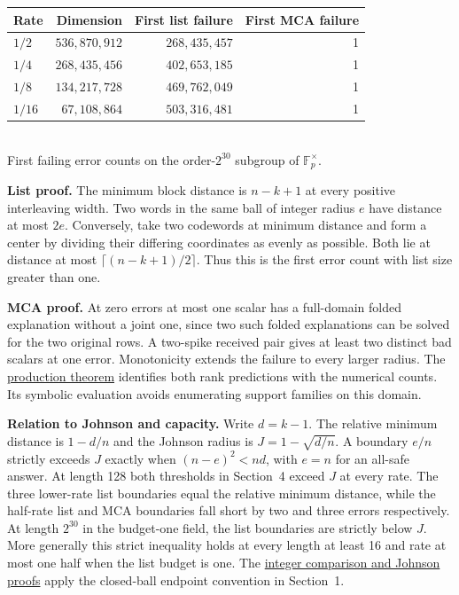 \documentclass[11pt,letterpaper]{article}
\begin{document}
\begin{center}
\begin{tabular}{@{}lrrr@{}}\toprule
Rate & Dimension & First list failure & First MCA failure\\\midrule
$1/2$  & $536{,}870{,}912$ & $268{,}435{,}457$ & 1\\
$1/4$  & $268{,}435{,}456$ & $402{,}653{,}185$ & 1\\
$1/8$  & $134{,}217{,}728$ & $469{,}762{,}049$ & 1\\
$1/16$ & $67{,}108{,}864$  & $503{,}316{,}481$ & 1\\\bottomrule
\end{tabular}\\[4pt]
{\small First failing error counts on the order-$2^{30}$ subgroup of $\mathbb F_p^\times$.}
\end{center}

\textbf{List proof.} The minimum block distance is $n-k+1$ at every positive interleaving width.
Two words in the same ball of integer radius $e$ have distance at most $2e$.
Conversely, take two codewords at minimum distance and form a center by dividing their differing coordinates as evenly as possible. Both lie at distance at most $\lceil(n-k+1)/2\rceil$. Thus this is the first error count with list size greater than one.

\textbf{MCA proof.} At zero errors at most one scalar has a full-domain folded explanation without a joint one, since two such folded explanations can be solved for the two original rows. A two-spike received pair gives at least two distinct bad scalars at one error. Monotonicity extends the failure to every larger radius. The
\href{https://github.com/SlopDotCash/proximityprize/blob/d7087b90e15b9ccb4232d248c47061e49a06c074/ArkLib/Research/ProximityGap/RankProductionDomain.lean}{production theorem}
identifies both rank predictions with the numerical counts. Its symbolic evaluation avoids enumerating support families on this domain.

\textbf{Relation to Johnson and capacity.} Write $d=k-1$. The relative minimum distance is $1-d/n$ and the Johnson radius is $J=1-\sqrt{d/n}$. A boundary $e/n$ strictly exceeds $J$ exactly when $(n-e)^2<nd$, with $e=n$ for an all-safe answer. At length 128 both thresholds in Section~4 exceed $J$ at every rate. The three lower-rate list boundaries equal the relative minimum distance, while the half-rate list and MCA boundaries fall short by two and three errors respectively. At length $2^{30}$ in the budget-one field, the list boundaries are strictly below $J$. More generally this strict inequality holds at every length at least 16 and rate at most one half when the list budget is one.
The \href{https://github.com/SlopDotCash/proximityprize/blob/d7087b90e15b9ccb4232d248c47061e49a06c074/ArkLib/Research/ProximityGap/RankJohnsonComparison.lean}{integer comparison and Johnson proofs}
apply the closed-ball endpoint convention in Section~1.
\end{document}
